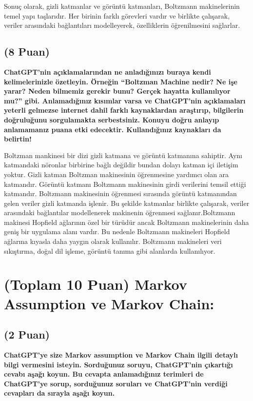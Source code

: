 \documentclass[11pt]{article}
\begin{document}
Sonuç olarak, gizli katmanlar ve görüntü katmanları, Boltzmann makinelerinin temel yapı taşlarıdır. Her birinin farklı görevleri vardır ve birlikte çalışarak, veriler arasındaki bağlantıları modelleyerek, özelliklerin öğrenilmesini sağlarlar.

\subsection{(8 Puan)} \textbf{ChatGPT’nin açıklamalarından ne anladığınızı buraya kendi kelimelerinizle özetleyin. Örneğin ``Boltzman Machine nedir? Ne işe yarar? Neden bilmemiz gerekir bunu? Gerçek hayatta kullanılıyor mu?'' gibi. Anlamadığınız kısımlar varsa ve ChatGPT’nin açıklamaları yeterli gelmezse internet dahil farklı kaynaklardan araştırıp, bilgilerin doğruluğunu sorgulamakta serbestsiniz. Konuyu doğru anlayıp anlamamanız puana etki edecektir. Kullandığınız kaynakları da belirtin!}

Boltzman mankinesi bir dizi gizli katmana ve görüntü katmanına sahiptir. Aynı katmandaki nöronlar birbirine bağlı değildir bundan dolayı katman içi iletişim yoktur. Gizli katman Boltzman makinesinin öğrenmesine yardımcı olan ara katmandır. Görüntü katmanı Boltzmann makinesinin girdi verilerini temsil ettiği katmandır. Boltzmann makinesinin öğrenmesi sırasında görüntü katmanından gelen veriler gizli katmanda işlenir. Bu şekilde katmanlar birlikte çalışarak, veriler arasındaki bağlantılar modellenerek makinenin öğrenmesi sağlanır.Boltzmann makinesi Hopfield ağlarının özel bir türüdür ancak Boltzmann makinelerinin daha geniş bir uygulama alanı vardır. Bu nedenle Boltzmann makineleri Hopfield ağlarına kıyasla daha yaygın olarak kullanılır. Boltzmann makineleri veri sıkıştırma, doğal dil işleme, görüntü tanıma gibi alanlarda kullanılıyor.

\section{(Toplam 10 Puan) Markov Assumption ve Markov Chain:}

\subsection{(2 Puan)} \textbf{ChatGPT’ye size Markov assumption ve Markov Chain ilgili detaylı bilgi vermesini isteyin. Sorduğunuz soruyu, ChatGPT'nin çıkartığı cevabı aşağı koyun. Bu cevapta anlamadığınız terimleri de ChatGPT’ye sorup, sorduğunuz soruları ve ChatGPT’nin verdiği cevapları da sırayla aşağı koyun.}
\end{document}
